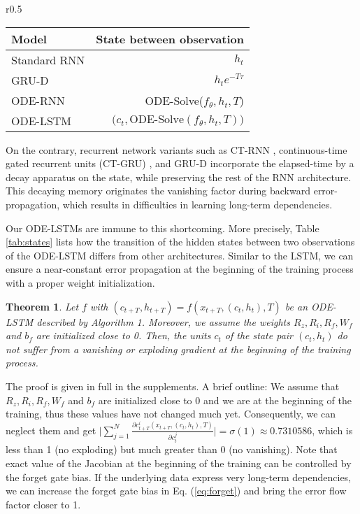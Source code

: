 \documentclass{article}
\newtheorem{theorem}{Theorem}
\begin{document}
\begin{wraptable}[9]{r}{0.5\textwidth}
    \vspace{-4mm}
    \centering
    \caption{Change to the hidden states of an RNN between two observations $t$ and $t+T$}
    \vspace{-2mm}
    \begin{tabular}{lr}
        \toprule
        \textbf{Model} & State between observation \\
        \midrule
        Standard RNN & $h_t$ \\
        GRU-D & $h_t e^{-T \tau}$  \\
        ODE-RNN & ODE-Solve($f_\theta,h_t, T$)  \\
        ODE-LSTM & $\big(c_t, \text{ODE-Solve}(f_\theta,h_t, T)\big)$ \\
        \bottomrule
    \end{tabular}
    \vspace{1mm}
    \label{tab:states}
\end{wraptable}
On the contrary, recurrent network variants such as CT-RNN \cite{funahashi1993approximation}, continuous-time gated recurrent units (CT-GRU) \cite{mozer2017discrete}, and GRU-D \cite{che2018recurrent} incorporate the elapsed-time by a decay apparatus on the state, while preserving the rest of the RNN architecture. This decaying memory originates the vanishing factor during backward error-propagation, which results in difficulties in learning long-term dependencies. 

Our ODE-LSTMs are immune to this shortcoming.
More precisely, Table \ref{tab:states} lists how the transition of the hidden states between two observations of the ODE-LSTM differs from other architectures. 
Similar to the LSTM, we can ensure a near-constant error propagation at the beginning of the training process with a proper weight initialization.
\begin{theorem}
\label{thm:ode_lstm}
    Let $f$ with $(c_{t+T},h_{t+T}) = f(x_{t+T},(c_t,h_t),T)$ be an ODE-LSTM described by Algorithm 1. Moreover, we assume the weights  $R_z, R_i, R_f, W_f$ and $b_f$ are initialized close to 0.
    Then, the units $c_t$ of the state pair $(c_t,h_t)$ do not suffer from a vanishing or exploding gradient at the beginning of the training process.
    \vspace{-2.5mm}
\end{theorem}
The proof is given in full in the supplements. A brief outline: We assume that $R_z, R_i, R_f, W_f$ and $b_f$ are initialized close to 0 and we are at the beginning of the training, thus these values have not changed much yet. Consequently, we can neglect them and get $ \Big| \sum_{j=1}^{N} \frac{\partial {c^i_{t+T}(x_{t+T},(c_t,h_t),T)}}{\partial c^j_t} \Big|= \sigma(1) \approx 0.7310586$,  which is less than 1 (no exploding) but much greater than 0 (no vanishing). Note that exact value of the Jacobian at the beginning of the training can be controlled by the forget gate bias. If the underlying data express very long-term dependencies, we can increase the forget gate bias in Eq. (\ref{eq:forget}) and bring the error flow factor closer to 1. 
\end{document}
